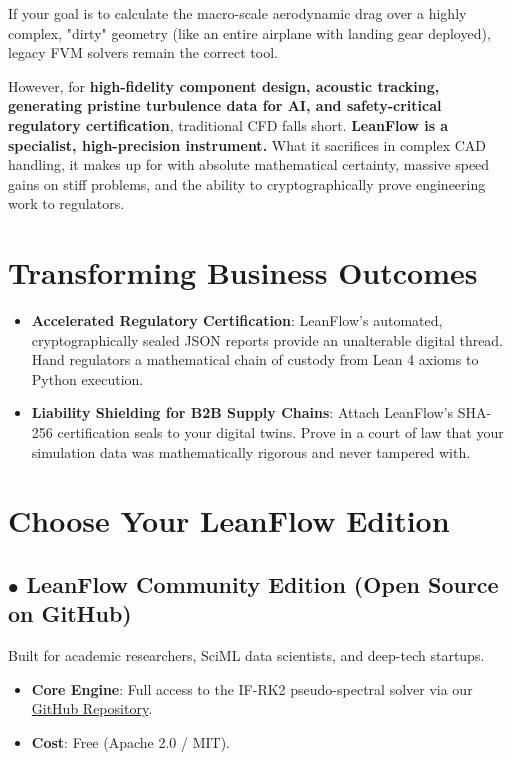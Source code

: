 \documentclass[11pt,a4paper]{article}
\begin{document}
If your goal is to calculate the macro-scale aerodynamic drag over a highly complex, "dirty" geometry (like an entire airplane with landing gear deployed), legacy FVM solvers remain the correct tool.

However, for \textbf{high-fidelity component design, acoustic tracking, generating pristine turbulence data for AI, and safety-critical regulatory certification}, traditional CFD falls short. \textbf{LeanFlow is a specialist, high-precision instrument.} What it sacrifices in complex CAD handling, it makes up for with absolute mathematical certainty, massive speed gains on stiff problems, and the ability to cryptographically prove engineering work to regulators.

\section*{Transforming Business Outcomes}

\begin{itemize}
    \item \textbf{Accelerated Regulatory Certification}: LeanFlow’s automated, cryptographically sealed JSON reports provide an unalterable digital thread. Hand regulators a mathematical chain of custody from Lean 4 axioms to Python execution.
    \item \textbf{Liability Shielding for B2B Supply Chains}: Attach LeanFlow’s SHA-256 certification seals to your digital twins. Prove in a court of law that your simulation data was mathematically rigorous and never tampered with.
\end{itemize}

\section*{Choose Your LeanFlow Edition}

\subsection*{\textcolor{green!70!black}{$\bullet$} LeanFlow Community Edition (Open Source on GitHub)}
Built for academic researchers, SciML data scientists, and deep-tech startups.
\begin{itemize}
    \item \textbf{Core Engine}: Full access to the IF-RK2 pseudo-spectral solver via our \href{https://github.com/socrateai/leanflow}{GitHub Repository}.
    \item \textbf{Cost}: Free (Apache 2.0 / MIT).
\end{itemize}
\end{document}
